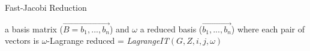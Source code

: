 \begin{algorithm}[H]
\caption{Fast-Jacobi Reduction}
\label{jacobiVariantReduction}
\begin{algorithmic}
\REQUIRE a basis matrix ($\vec{B = b_1,...,b_n}$) and $\omega$
\ENSURE a reduced basis ($\vec{b_1,...,b_n}$) where each pair of vectors is $\omega$-Lagrange reduced
            \STATE {$[G, Z]$} = \emph{LagrangeIT$(G,Z,i,j,\omega)$}
        \ENDFOR
    \ENDFOR
\ENDWHILE

\end{algorithmic}
\end{algorithm}